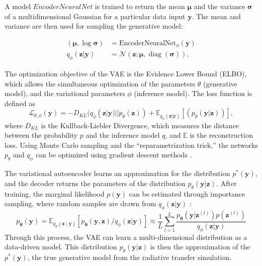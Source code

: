 \documentclass[fleqn,usenatbib,useAMS]{mnras}
\begin{document}
A model $EncoderNeuralNet$ is trained to return the mean $\boldsymbol{\mu}$ and the variance $\boldsymbol{\sigma}$ of a multidimensional Gaussian for a particular data input $\mathbf{y}$. 
The mean and variance are then used for sampling the generative model: 

\begin{equation}
\begin{aligned}
(\boldsymbol{\mu}, \log \boldsymbol{\sigma}) 
&=\text {EncoderNeuralNet}_{\phi}(\mathbf{y}) \\
q_{\phi}(\mathbf{z} | \mathbf{y}) &=\mathcal{N}(\mathbf{z} ; \boldsymbol{\mu}, \operatorname{diag}(\boldsymbol{\sigma})),
\end{aligned}
\end{equation}
\noindent  

The optimization objective of the VAE is the Evidence Lower Bound (ELBO), which allows the simultaneous optimization of the parameters $\theta$ (generative model), and the variational parameters $\phi$ (inference model).
The loss function is defined as
\begin{equation}
\mathcal{L}_{\theta, \phi}(\mathbf{y}) = - D_{KL}(q_{\phi}(\mathbf{z} | \mathbf{y}) || p_{\theta}(\mathbf{z})) + \mathbb{E}_{q_{\phi}(\mathbf{z}|\mathbf{y})} [ ( p_{\theta}(\mathbf{y | \mathbf{z}}) ) ], 
\end{equation}
\noindent where $D_{KL}$ is the Kullback-Liebler Divergence, which measures the distance between the probability $p$ and the inference model $q$, and $\mathbb{E}$ is the reconstruction loss.
Using Monte Carlo sampling and the ``reparametrization trick,'' the networks $p_{\theta}$ and $q_{\phi}$ can be optimized using gradient descent methods \citep{kingmaAutoEncodingVariationalBayes2014, kingmaIntroductionVariationalAutoencoders2019, rezendeStochasticBackpropagationApproximate2014}. 

The variational autoencoder learns an approximation for the distribution  $p^*(\mathbf{y})$, and the decoder returns the parameters of the distribution $p_{\theta}(\mathbf{y} | \mathbf{z})$.
After training, the marginal likelihood $p(\mathbf{y})$ can be estimated through importance sampling, where random samples are drawn from $q_{\phi}(\mathbf{z}| \mathbf{y})$ \citep{rezendeStochasticBackpropagationApproximate2014}:
\begin{equation}
p_{\boldsymbol{\theta}}(\mathbf{y})= \mathbb{E}_{q_{\phi}(\mathbf{z} \mid \mathbf{y})}\left[p_{\boldsymbol{\theta}}(\mathbf{y}, \mathbf{z}) / q_{\phi}(\mathbf{z}|\mathbf{y})\right] \approx \frac{1}{L} \sum_{l=1}^{L} \frac{ p_{\boldsymbol{\theta}}(\mathbf{y}|\mathbf{z}^{(l)}) p(\mathbf{z}^{(l)})}{q_{\phi}(\mathbf{z}|\mathbf{y})}
\end{equation}
Through this process, the VAE can learn a  multi-dimensional distribution as a data-driven model. 
This distribution $p_{\theta}(\mathbf{y} | \mathbf{z})$ is then the approximation of the $p^*(\mathbf{y})$, the true generative model from the radiative transfer simulation.
\end{document}
